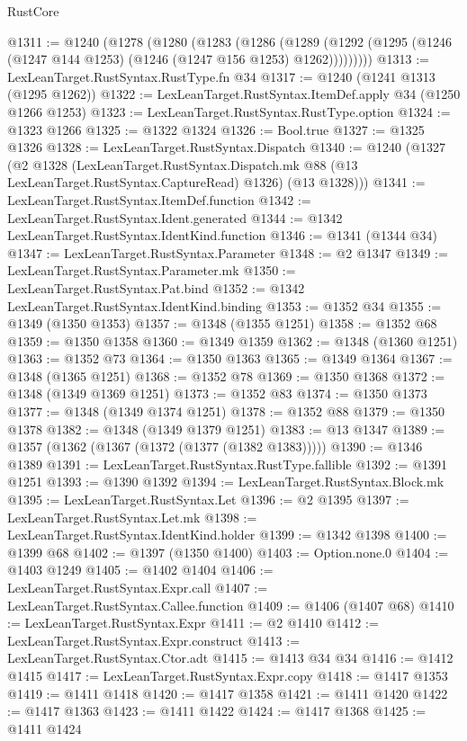 \begin{lexlean}{RustCore}
\begin{coremodule}
@1311 := @1240
    (@1278
      (@1280
        (@1283
          (@1286
            (@1289 (@1292 (@1295 (@1246 (@1247 @144 @1253) (@1246 (@1247 @156 @1253) @1262)))))))))
@1313 := LexLeanTarget.RustSyntax.RustType.fn @34
@1317 := @1240 (@1241 @1313 (@1295 @1262))
@1322 := LexLeanTarget.RustSyntax.ItemDef.apply @34 (@1250 @1266 @1253)
@1323 := LexLeanTarget.RustSyntax.RustType.option
@1324 := @1323 @1266
@1325 := @1322 @1324
@1326 := Bool.true
@1327 := @1325 @1326
@1328 := LexLeanTarget.RustSyntax.Dispatch
@1340 := @1240
    (@1327
      (@2
        @1328
        (LexLeanTarget.RustSyntax.Dispatch.mk @88 (@13 LexLeanTarget.RustSyntax.CaptureRead) @1326)
        (@13 @1328)))
@1341 := LexLeanTarget.RustSyntax.ItemDef.function
@1342 := LexLeanTarget.RustSyntax.Ident.generated
@1344 := @1342 LexLeanTarget.RustSyntax.IdentKind.function
@1346 := @1341 (@1344 @34)
@1347 := LexLeanTarget.RustSyntax.Parameter
@1348 := @2 @1347
@1349 := LexLeanTarget.RustSyntax.Parameter.mk
@1350 := LexLeanTarget.RustSyntax.Pat.bind
@1352 := @1342 LexLeanTarget.RustSyntax.IdentKind.binding
@1353 := @1352 @34
@1355 := @1349 (@1350 @1353)
@1357 := @1348 (@1355 @1251)
@1358 := @1352 @68
@1359 := @1350 @1358
@1360 := @1349 @1359
@1362 := @1348 (@1360 @1251)
@1363 := @1352 @73
@1364 := @1350 @1363
@1365 := @1349 @1364
@1367 := @1348 (@1365 @1251)
@1368 := @1352 @78
@1369 := @1350 @1368
@1372 := @1348 (@1349 @1369 @1251)
@1373 := @1352 @83
@1374 := @1350 @1373
@1377 := @1348 (@1349 @1374 @1251)
@1378 := @1352 @88
@1379 := @1350 @1378
@1382 := @1348 (@1349 @1379 @1251)
@1383 := @13 @1347
@1389 := @1357 (@1362 (@1367 (@1372 (@1377 (@1382 @1383)))))
@1390 := @1346 @1389
@1391 := LexLeanTarget.RustSyntax.RustType.fallible
@1392 := @1391 @1251
@1393 := @1390 @1392
@1394 := LexLeanTarget.RustSyntax.Block.mk
@1395 := LexLeanTarget.RustSyntax.Let
@1396 := @2 @1395
@1397 := LexLeanTarget.RustSyntax.Let.mk
@1398 := LexLeanTarget.RustSyntax.IdentKind.holder
@1399 := @1342 @1398
@1400 := @1399 @68
@1402 := @1397 (@1350 @1400)
@1403 := Option.none.{0}
@1404 := @1403 @1249
@1405 := @1402 @1404
@1406 := LexLeanTarget.RustSyntax.Expr.call
@1407 := LexLeanTarget.RustSyntax.Callee.function
@1409 := @1406 (@1407 @68)
@1410 := LexLeanTarget.RustSyntax.Expr
@1411 := @2 @1410
@1412 := LexLeanTarget.RustSyntax.Expr.construct
@1413 := LexLeanTarget.RustSyntax.Ctor.adt
@1415 := @1413 @34 @34
@1416 := @1412 @1415
@1417 := LexLeanTarget.RustSyntax.Expr.copy
@1418 := @1417 @1353
@1419 := @1411 @1418
@1420 := @1417 @1358
@1421 := @1411 @1420
@1422 := @1417 @1363
@1423 := @1411 @1422
@1424 := @1417 @1368
@1425 := @1411 @1424

\end{coremodule}
\end{lexlean}
